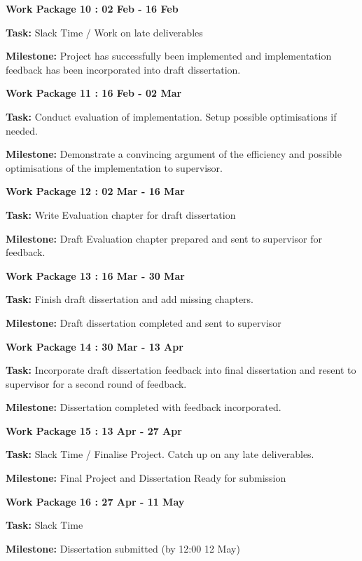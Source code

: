 \documentclass[12pt,a4paper,twoside]{article}
\begin{document}
\textbf{Work Package 10 : 02 Feb - 16 Feb}

\textbf{Task: }Slack Time / Work on late deliverables

\textbf{Milestone: }Project has successfully been implemented and implementation feedback has been incorporated into draft dissertation.

\bigskip

\textbf{Work Package 11 : 16 Feb - 02 Mar}

\textbf{Task: }Conduct evaluation of implementation. Setup possible optimisations if needed.

\textbf{Milestone: }Demonstrate a convincing argument of the efficiency and possible optimisations of the implementation to supervisor.

\bigskip

\textbf{Work Package 12 : 02 Mar - 16 Mar}

\textbf{Task: }Write Evaluation chapter for draft dissertation

\textbf{Milestone: }Draft Evaluation chapter prepared and sent to supervisor for feedback.

\bigskip

\textbf{Work Package 13 : 16 Mar - 30 Mar}

\textbf{Task: }Finish draft dissertation and add missing chapters.

\textbf{Milestone: }Draft dissertation completed and sent to supervisor

\bigskip

\textbf{Work Package 14 : 30 Mar - 13 Apr}

\textbf{Task: }Incorporate draft dissertation feedback into final dissertation and resent to supervisor for a second round of feedback.

\textbf{Milestone: }Dissertation completed with feedback incorporated.

\bigskip

\textbf{Work Package 15 : 13 Apr - 27 Apr}

\textbf{Task: }Slack Time / Finalise Project. Catch up on any late deliverables.

\textbf{Milestone: }Final Project and Dissertation Ready for submission

\bigskip

\textbf{Work Package 16 : 27 Apr - 11 May}

\textbf{Task: }Slack Time

\textbf{Milestone: }Dissertation submitted (by 12:00 12 May)
\end{document}

